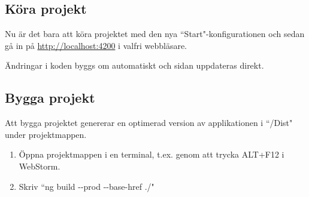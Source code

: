 \documentclass{article}
\begin{document}
\subsection{Köra projekt}
Nu är det bara att köra projektet med den nya ``Start"-konfigurationen och sedan gå in på \url{http://localhost:4200} i valfri webbläsare.

Ändringar i koden byggs om automatiskt och sidan uppdateras direkt.
\subsection{Bygga projekt}
Att bygga projektet genererar en optimerad version av applikationen i ``/Dist" under projektmappen.
\begin{enumerate}
\item Öppna projektmappen i en terminal, t.ex. genom att trycka ALT+F12 i WebStorm.
\item Skriv ``ng build -{}-prod -{}-base-href ./"
\end{enumerate}
\end{document}

